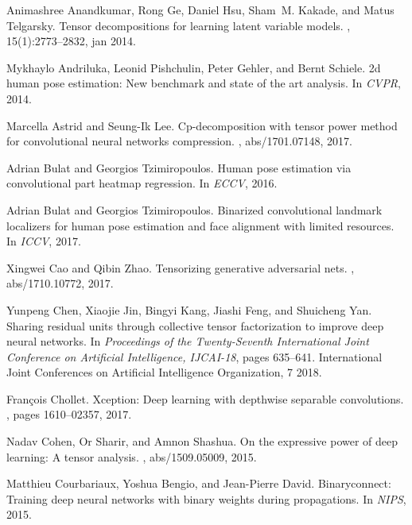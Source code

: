 \documentclass[10pt,twocolumn,letterpaper]{article}
\begin{document}
{\small

\begin{thebibliography}{10}\itemsep=-1pt

Animashree Anandkumar, Rong Ge, Daniel Hsu, Sham~M. Kakade, and Matus
  Telgarsky.
\newblock Tensor decompositions for learning latent variable models.
, 15(1):2773--2832, jan 2014.

Mykhaylo Andriluka, Leonid Pishchulin, Peter Gehler, and Bernt Schiele.
\newblock 2d human pose estimation: New benchmark and state of the art
  analysis.
\newblock In {\em CVPR}, 2014.

Marcella Astrid and Seung{-}Ik Lee.
\newblock Cp-decomposition with tensor power method for convolutional neural
  networks compression.
, abs/1701.07148, 2017.

Adrian Bulat and Georgios Tzimiropoulos.
\newblock Human pose estimation via convolutional part heatmap regression.
\newblock In {\em ECCV}, 2016.

Adrian Bulat and Georgios Tzimiropoulos.
\newblock Binarized convolutional landmark localizers for human pose estimation
  and face alignment with limited resources.
\newblock In {\em ICCV}, 2017.

Xingwei Cao and Qibin Zhao.
\newblock Tensorizing generative adversarial nets.
, abs/1710.10772, 2017.

Yunpeng Chen, Xiaojie Jin, Bingyi Kang, Jiashi Feng, and Shuicheng Yan.
\newblock Sharing residual units through collective tensor factorization to
  improve deep neural networks.
\newblock In {\em Proceedings of the Twenty-Seventh International Joint
  Conference on Artificial Intelligence, {IJCAI-18}}, pages 635--641.
  International Joint Conferences on Artificial Intelligence Organization, 7
  2018.

Fran{\c{c}}ois Chollet.
\newblock Xception: Deep learning with depthwise separable convolutions.
, pages 1610--02357, 2017.

Nadav Cohen, Or Sharir, and Amnon Shashua.
\newblock On the expressive power of deep learning: {A} tensor analysis.
, abs/1509.05009, 2015.

Matthieu Courbariaux, Yoshua Bengio, and Jean-Pierre David.
\newblock Binaryconnect: Training deep neural networks with binary weights
  during propagations.
\newblock In {\em NIPS}, 2015.


\end{thebibliography}}
\end{document}
